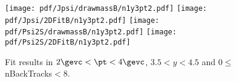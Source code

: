 \begin{figure}[H]
\begin{center}
\texttt{[image: pdf/Jpsi/drawmassB/n1y3pt2.pdf]}
\texttt{[image: pdf/Jpsi/2DFitB/n1y3pt2.pdf]}
\vspace*{-0.5cm}
\texttt{[image: pdf/Psi2S/drawmassB/n1y3pt2.pdf]}
\texttt{[image: pdf/Psi2S/2DFitB/n1y3pt2.pdf]}
\vspace*{-0.5cm}
\end{center}
\caption{Fit results in $2\gevc<\pt<4\gevc$, $3.5<y<4.5$ and 0$\leq$nBackTracks$<$8.}
\label{Fitn1y3pt2}
\end{figure}
